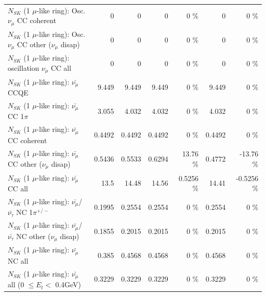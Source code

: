 \begin{table}
\begin{tabular}{| l | r | r | r  r | r  r |}
                        $N_{SK}$ (1 $\mu$-like ring): Osc. $\nu_\mu$ CC coherent &               0 &               0 &               0 &        0 \%  &               0 &        0 \%  \\ 
         $N_{SK}$ (1 $\mu$-like ring): Osc. $\nu_\mu$ CC other ($\nu_\mu$ disap) &               0 &               0 &               0 &        0 \%  &               0 &        0 \%  \\ 
                      $N_{SK}$ (1 $\mu$-like ring): oscillation $\nu_\mu$ CC all &               0 &               0 &               0 &        0 \%  &               0 &        0 \%  \\ 
\hline
\hline
                              $N_{SK}$ (1 $\mu$-like ring): $\bar{\nu_\mu}$ CCQE &           9.449 &           9.449 &           9.449 &        0 \%  &           9.449 &        0 \%  \\ 
                         $N_{SK}$ (1 $\mu$-like ring): $\bar{\nu_\mu}$ CC 1$\pi$ &           3.055 &           4.032 &           4.032 &        0 \%  &           4.032 &        0 \%  \\ 
                       $N_{SK}$ (1 $\mu$-like ring): $\bar{\nu_\mu}$ CC coherent &          0.4492 &          0.4492 &          0.4492 &        0 \%  &          0.4492 &        0 \%  \\ 
        $N_{SK}$ (1 $\mu$-like ring): $\bar{\nu_\mu}$ CC other ($\nu_\mu$ disap) &          0.5436 &          0.5533 &          0.6294 &    13.76 \%  &          0.4772 &   -13.76 \%  \\ 
                          $N_{SK}$ (1 $\mu$-like ring): $\bar{\nu_{\mu}}$ CC all &            13.5 &           14.48 &           14.56 &   0.5256 \%  &           14.41 &  -0.5256 \%  \\ 
\hline
  $N_{SK}$ (1 $\mu$-like ring): $\bar{\nu_\mu}$/$\bar{\nu_\tau}$ NC 1$\pi^{+/-}$ &          0.1995 &          0.2554 &          0.2554 &        0 \%  &          0.2554 &        0 \%  \\ 
$N_{SK}$ (1 $\mu$-like ring): $\bar{\nu_\mu}$/$\bar{\nu_\tau}$ NC other ($\nu_\mu$ disap) &          0.1855 &          0.2015 &          0.2015 &        0 \%  &          0.2015 &        0 \%  \\ 
                          $N_{SK}$ (1 $\mu$-like ring): $\bar{\nu_{\mu}}$ NC all &           0.385 &          0.4568 &          0.4568 &        0 \%  &          0.4568 &        0 \%  \\ 
\hline
   $N_{SK}$ (1 $\mu$-like ring): $\bar{\nu_{\mu}}$ all (0 $\leq E_{t} <$ 0.4GeV) &          0.3229 &          0.3229 &          0.3229 &        0 \%  &          0.3229 &        0 \%  \\ 

\end{tabular}
\end{table}
